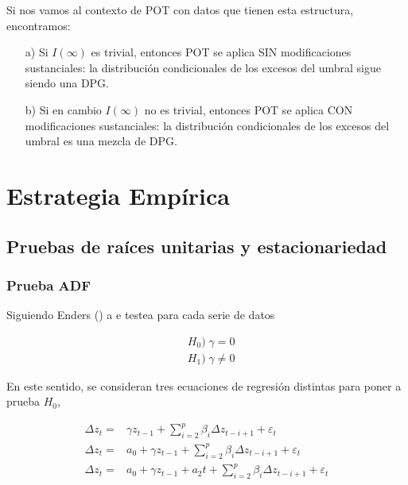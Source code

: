 \documentclass[
  12pt]{article}
\begin{document}
Si nos vamos al contexto de POT con datos que tienen esta estructura,
encontramos:

\begin{itemize}
\item[a)] Si $I(\infty)$ es trivial, entonces POT se aplica SIN modificaciones sustanciales: la distribución condicionales de los excesos del umbral sigue siendo una DPG.
\item[b)] Si en cambio $I(\infty)$ no es trivial, entonces POT se aplica CON modificaciones sustanciales: la distribución condicionales de los excesos del umbral es una mezcla de DPG.
\end{itemize}

\newpage

\section{Estrategia Empírica}\label{estrategia-empuxedrica}

\subsection{Pruebas de raíces unitarias y
estacionariedad}\label{pruebas-de-rauxedces-unitarias-y-estacionariedad}

\subsubsection{Prueba ADF}\label{prueba-adf}

Siguiendo Enders () a e testea para cada
serie de datos

\begin{align*}
    &H_0)\; \gamma = 0\\
    &H_1)\; \gamma \neq 0   
\end{align*}

En este sentido, se consideran tres ecuaciones de regresión distintas
para poner a prueba \(H_0\),

\begin{align}
    \label{eq: modelo_c}
    \Delta z_t=&\gamma z_{t-1} + \sum_{i=2}^p \beta_i \Delta z_{t-i+1} + \varepsilon_t \\
    \label{eq: modelo_b}
    \Delta z_t=&a_0+\gamma z_{t-1} + \sum_{i=2}^p \beta_i \Delta z_{t-i+1} + \varepsilon_t \\
    \label{eq: modelo_a}
    \Delta z_t=&a_0+\gamma z_{t-1} + a_2 t+ \sum_{i=2}^p \beta_i \Delta z_{t-i+1} + \varepsilon_t
\end{align}
\end{document}
